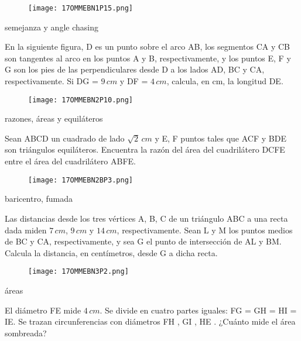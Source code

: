 \begin{figure}[h]
    \centering
    \texttt{[image: 17OMMEBN1P15.png]}
\end{figure}

semejanza y angle chasing

\begin{problem}[OMMEB 2017]
    En la siguiente figura, D es un punto sobre el arco AB, 
    los segmentos CA y CB son tangentes al arco en los puntos A 
    y B, respectivamente, y los puntos E, F y G son los pies de 
    las perpendiculares desde D a los lados AD, BC y CA, 
    respectivamente. Si DG = \(9\, cm\) y DF = \(4\, cm\), 
    calcula, en cm, la longitud DE.
\end{problem}

\begin{figure}[h]
    \centering
    \texttt{[image: 17OMMEBN2P10.png]}
\end{figure}

razones, áreas y equiláteros

\begin{problem}[OMMEB 2017]
    Sean ABCD un cuadrado de lado \(\sqrt{2}\, cm\) y E, F 
    puntos tales que ACF y BDE son triángulos equiláteros.
    Encuentra la razón del área del cuadrilátero DCFE entre el 
    área del cuadrilátero ABFE.
\end{problem}

\begin{figure}[h]
    \centering
    \texttt{[image: 17OMMEBN2BP3.png]}
\end{figure}

baricentro, fumada

\begin{problem}[OMMEB 2017]
    Las distancias desde los tres vértices A, B, C de un 
    triángulo ABC a una recta dada miden \(7\, cm\), \(9\, cm\) 
    y \(14\, cm\), respectivamente. Sean L y M los puntos medios 
    de BC y CA, respectivamente, y sea G el punto de 
    intersección de AL y BM. Calcula la distancia, en 
    centímetros, desde G a dicha recta.
\end{problem}

\begin{figure}[h]
    \centering
    \texttt{[image: 17OMMEBN3P2.png]}
\end{figure}

áreas

\begin{problem}[OMMEB 2017]
    El diámetro FE mide \(4\,cm.\) Se divide en cuatro partes 
    iguales: FG = GH = HI = IE. Se trazan circunferencias con 
    diámetros FH , GI , HE . ¿Cuánto mide el área sombreada?
\end{problem}

